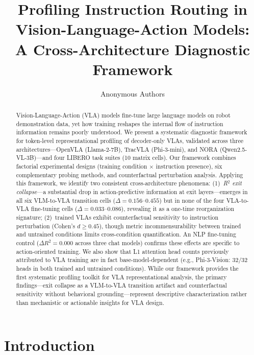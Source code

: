 \documentclass[letterpaper]{article}
\title{Profiling Instruction Routing in Vision-Language-Action Models:\\ A Cross-Architecture Diagnostic Framework}
\author[1]{Anonymous Authors}
\affil[1]{Anonymous Institution}
\date{}
\begin{document}
\maketitle

\begin{abstract}
Vision-Language-Action (VLA) models fine-tune large language models on robot demonstration data, yet how training reshapes the internal flow of instruction information remains poorly understood. We present a systematic diagnostic framework for token-level representational profiling of decoder-only VLAs, validated across three architectures---OpenVLA (Llama-2-7B), TracVLA (Phi-3-mini), and NORA (Qwen2.5-VL-3B)---and four LIBERO task suites (10 matrix cells). Our framework combines factorial experimental designs (training condition $\times$ instruction presence), six complementary probing methods, and counterfactual perturbation analysis. Applying this framework, we identify two consistent cross-architecture phenomena: (1)~\emph{R$^2$ exit collapse}---a substantial drop in action-predictive information at exit layers---emerges in all six VLM-to-VLA transition cells ($\Delta = 0.156$--$0.455$) but in none of the four VLA-to-VLA fine-tuning cells ($\Delta = 0.033$--$0.086$), revealing it as a one-time reorganization signature; (2)~trained VLAs exhibit counterfactual sensitivity to instruction perturbation (Cohen's $d \geq 0.45$), though metric incommensurability between trained and untrained conditions limits cross-condition quantification. An NLP fine-tuning control ($\Delta R^2 = 0.000$ across three chat models) confirms these effects are specific to action-oriented training. We also show that L1 attention head counts previously attributed to VLA training are in fact base-model-dependent (e.g., Phi-3-Vision: 32/32 heads in both trained and untrained conditions). While our framework provides the first systematic profiling toolkit for VLA representational analysis, the primary findings---exit collapse as a VLM-to-VLA transition artifact and counterfactual sensitivity without behavioral grounding---represent descriptive characterization rather than mechanistic or actionable insights for VLA design.
\end{abstract}

\section{Introduction}
\end{document}
